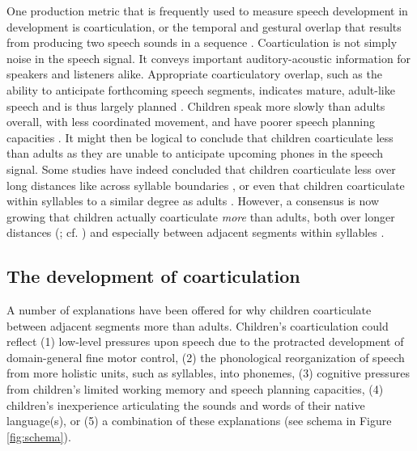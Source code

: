 \documentclass[a4paper,man,natbib,donotrepeattitle, apacite]{apa6}
\begin{document}
One production metric that is frequently used to measure speech development in development is coarticulation, or the temporal and gestural overlap that results from producing two speech sounds in a sequence \cite{gerosaAnalyzingChildrenSpeech2006,goffmanBreadthCoarticulatoryUnits2008,zharkovaCoarticulationIndicatorSpeech2011}. Coarticulation is not simply noise in the speech signal. It conveys important auditory-acoustic information for speakers and listeners alike. Appropriate coarticulatory overlap, such as the ability to anticipate forthcoming speech segments, indicates mature, adult-like speech and is thus largely planned \cite{barbierWhatAnticipatoryCoarticulation2020,bradlowConfluentTalkerListeneroriented2002,whalenCoarticulationLargelyPlanned1990}. Children speak more slowly than adults overall, with less coordinated movement, and have poorer speech planning capacities \cite{greenPhysiologicDevelopmentSpeech2000,goffmanRelationsSegmentalMotor2007,leeAcousticsChildrenSpeech1999}. It might then be logical to conclude that children coarticulate less than adults as they are unable to anticipate upcoming phones in the speech signal. Some studies have indeed concluded that children coarticulate less over long distances like across syllable boundaries \cite{barbierWhatAnticipatoryCoarticulation2020}, or even that children coarticulate within syllables to a similar degree as adults \cite{katzAnticipatoryCoarticulationSpeech1991,noirayDevelopmentMotorSynergies2013,serenoDevelopmentalAspectsLingual1987,zharkovaDynamicsVoicelessSibilant2018}. However, a consensus is now growing that children actually coarticulate \textit{more} than adults, both over longer distances (; cf. ) and especially between adjacent segments within syllables \cite{nittrouerEmergencePhoneticSegments1989,nittrouerHowChildrenLearn1996,noirayBackFutureNonlinear2019,rubertusVocalicActivationWidth2020,zharkovaCoarticulationIndicatorSpeech2011,zharkovaSpatialTemporalLingual2014}. 

\subsection{The development of coarticulation}

A number of explanations have been offered for why children coarticulate between adjacent segments more than adults. Children’s coarticulation could reflect (1) low-level pressures upon speech due to the protracted development of domain-general fine motor control, (2) the phonological reorganization of speech from more holistic units, such as syllables, into phonemes, (3) cognitive pressures from children's limited working memory and speech planning capacities, (4) children's inexperience articulating the sounds and words of their native language(s), or (5) a combination of these explanations (see schema in Figure \ref{fig:schema}). 
\end{document}
